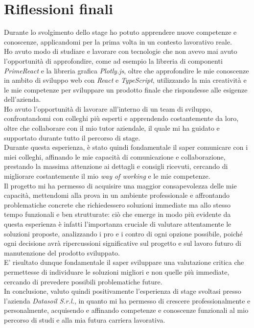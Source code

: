 \section{Riflessioni finali}
Durante lo svolgimento dello stage ho potuto apprendere nuove competenze e conoscenze, applicandomi per la prima volta in un contesto lavorativo reale. \\
Ho avuto modo di studiare e lavorare con tecnologie che non avevo mai avuto l'opportunità di approfondire, come ad esempio la libreria di componenti \textit{PrimeReact} e la
libreria grafica \textit{Plotly.js}, oltre che approfondire le mie conoscenze in ambito di sviluppo web con \textit{React} e \textit{TypeScript}, utilizzando la mia
creatività e le mie competenze per sviluppare un prodotto finale che rispondesse alle esigenze dell'azienda. \\
Ho avuto l'opportunità di lavorare all'interno di un team di sviluppo, confrontandomi con colleghi più esperti e apprendendo costantemente da loro, oltre che collaborare
con il mio tutor aziendale, il quale mi ha guidato e supportato durante tutto il percorso di stage. \\
Durante questa esperienza, è stato quindi fondamentale il saper comunicare con i miei colleghi, affinando le mie capacità di comunicazione e collaborazione, prestando la massima
attenzione ai dettagli e consigli ricevuti, cercando di migliorare costantemente il mio \textit{way of working} e le mie competenze. \\
Il progetto mi ha permesso di acquisire una maggior consapevolezza delle mie capacità, mettendomi alla prova in un ambiente professionale e affrontando problematiche concrete
che richiedessero soluzioni immediate ma allo stesso tempo funzionali e ben strutturate: ciò che emerge in modo più evidente da questa esperienza è infatti l'importanza
cruciale di valutare attentamente le soluzioni proposte, analizzando i pro e i contro di ogni opzione possibile, poiché ogni decisione avrà ripercussioni significative sul
progetto e sul lavoro futuro di manutenzione del prodotto sviluppato. \\
E' risultato dunque fondamentale il saper sviluppare una valutazione critica che permettesse di individuare le soluzioni migliori e non quelle più immediate, cercando di prevedere
possibili problematiche future. \\
In conclusione, valuto quindi positivamente l'esperienza di stage svoltasi presso l'azienda \textit{Datasoil S.r.l.}, in quanto mi ha permesso di crescere professionalmente e personalmente,
acquisendo e affinando competenze e conoscenze funzionali al mio percorso di studi e alla mia futura carriera lavorativa.
